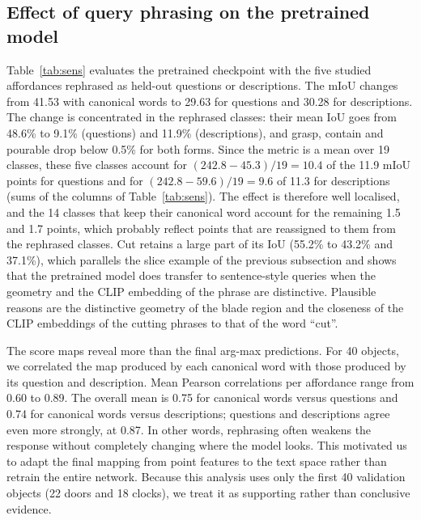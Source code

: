 \documentclass[conference]{IEEEtran}
\begin{document}
\subsection{Effect of query phrasing on the pretrained model}
Table~\ref{tab:sens} evaluates the pretrained checkpoint with the five studied affordances rephrased as held-out questions or descriptions. The mIoU changes from 41.53 with canonical words to 29.63 for questions and 30.28 for descriptions. The change is concentrated in the rephrased classes: their mean IoU goes from 48.6\% to 9.1\% (questions) and 11.9\% (descriptions), and grasp, contain and pourable drop below 0.5\% for both forms. Since the metric is a mean over 19 classes, these five classes account for $(242.8-45.3)/19=10.4$ of the 11.9 mIoU points for questions and for $(242.8-59.6)/19=9.6$ of 11.3 for descriptions (sums of the columns of Table~\ref{tab:sens}). The effect is therefore well localised, and the 14 classes that keep their canonical word account for the remaining 1.5 and 1.7 points, which probably reflect points that are reassigned to them from the rephrased classes. Cut retains a large part of its IoU (55.2\% to 43.2\% and 37.1\%), which parallels the slice example of the previous subsection and shows that the pretrained model does transfer to sentence-style queries when the geometry and the CLIP embedding of the phrase are distinctive. Plausible reasons are the distinctive geometry of the blade region and the closeness of the CLIP embeddings of the cutting phrases to that of the word ``cut''.

The score maps reveal more than the final arg-max predictions. For 40 objects, we correlated the map produced by each canonical word with those produced by its question and description. Mean Pearson correlations per affordance range from 0.60 to 0.89. The overall mean is 0.75 for canonical words versus questions and 0.74 for canonical words versus descriptions; questions and descriptions agree even more strongly, at 0.87. In other words, rephrasing often weakens the response without completely changing where the model looks. This motivated us to adapt the final mapping from point features to the text space rather than retrain the entire network. Because this analysis uses only the first 40 validation objects (22 doors and 18 clocks), we treat it as supporting rather than conclusive evidence.
\end{document}
